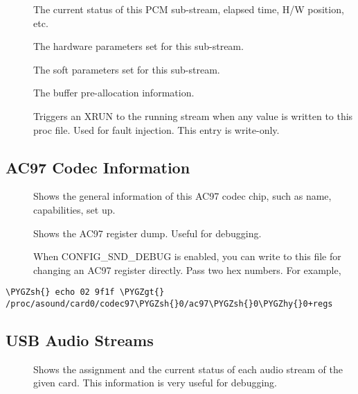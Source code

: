 \documentclass[a4paper,8pt,english]{sphinxmanual}
\def\PYGZgt{\char`\>}
\def\PYGZsh{\char`\#}
\def\PYGZhy{\char`\-}
\begin{document}
\begin{description}
\item[{}] \leavevmode
The current status of this PCM sub-stream, elapsed time,
H/W position, etc.

\item[{}] \leavevmode
The hardware parameters set for this sub-stream.

\item[{}] \leavevmode
The soft parameters set for this sub-stream.

\item[{}] \leavevmode
The buffer pre-allocation information.

\item[{}] \leavevmode
Triggers an XRUN to the running stream when any value is
written to this proc file.  Used for fault injection.
This entry is write-only.

\end{description}


\subsection{AC97 Codec Information}
\label{sound/designs/procfile:ac97-codec-information}\begin{description}
\item[{}] \leavevmode
Shows the general information of this AC97 codec chip, such as
name, capabilities, set up.

\item[{}] \leavevmode
Shows the AC97 register dump.  Useful for debugging.

When CONFIG\_SND\_DEBUG is enabled, you can write to this file for
changing an AC97 register directly.  Pass two hex numbers.
For example,

\end{description}

\begin{Verbatim}[commandchars=\\\{\}]
\PYGZsh{} echo 02 9f1f \PYGZgt{} /proc/asound/card0/codec97\PYGZsh{}0/ac97\PYGZsh{}0\PYGZhy{}0+regs
\end{Verbatim}


\subsection{USB Audio Streams}
\label{sound/designs/procfile:usb-audio-streams}\begin{description}
\item[{}] \leavevmode
Shows the assignment and the current status of each audio stream
of the given card.  This information is very useful for debugging.

\end{description}
\end{document}
